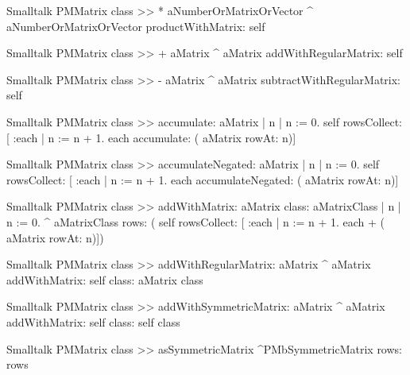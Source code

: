 \begin{displaycode}{Smalltalk}
PMMatrix class >> * aNumberOrMatrixOrVector
    ^ aNumberOrMatrixOrVector productWithMatrix: self
\end{displaycode}

\begin{displaycode}{Smalltalk}
PMMatrix class >> + aMatrix
    ^ aMatrix addWithRegularMatrix: self
\end{displaycode}

\begin{displaycode}{Smalltalk}
PMMatrix class >> - aMatrix
    ^ aMatrix subtractWithRegularMatrix: self
\end{displaycode}

\begin{displaycode}{Smalltalk}
PMMatrix class >> accumulate: aMatrix
    | n |
    n := 0.
    self rowsCollect: [ :each | n := n + 1. each accumulate: ( 
                                                    aMatrix rowAt: n)]
\end{displaycode}

\begin{displaycode}{Smalltalk}
PMMatrix class >> accumulateNegated: aMatrix
    | n |
    n := 0.
    self rowsCollect: [ :each | n := n + 1. each accumulateNegated: ( 
                                                    aMatrix rowAt: n)]
\end{displaycode}

\begin{displaycode}{Smalltalk}
PMMatrix class >> addWithMatrix: aMatrix class: aMatrixClass
    | n |
    n := 0.
    ^ aMatrixClass rows: ( self rowsCollect: [ :each | n := n + 1. 
                                          each + ( aMatrix rowAt: n)])
\end{displaycode}

\begin{displaycode}{Smalltalk}
PMMatrix class >> addWithRegularMatrix: aMatrix
    ^ aMatrix addWithMatrix: self class: aMatrix class
\end{displaycode}

\begin{displaycode}{Smalltalk}
PMMatrix class >> addWithSymmetricMatrix: aMatrix
    ^ aMatrix addWithMatrix: self class: self class
\end{displaycode}

\begin{displaycode}{Smalltalk}
PMMatrix class >> asSymmetricMatrix
    ^PMbSymmetricMatrix rows: rows
\end{displaycode}

